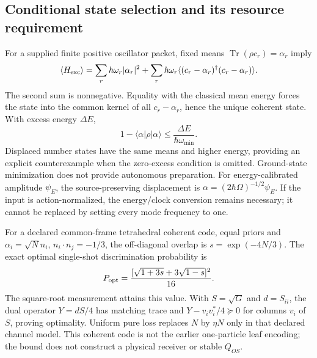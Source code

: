 \documentclass[11pt]{article}
\begin{document}
\subsection{Conditional state selection and its resource requirement}
For a supplied finite positive oscillator packet, fixed means
$\operatorname{Tr}(\rho c_r)=\alpha_r$ imply
\begin{equation}
 \langle H_{\rm exc}\rangle=
 \sum_r\hbar\omega_r|\alpha_r|^2+
 \sum_r\hbar\omega_r
 \langle(c_r-\alpha_r)^\dagger(c_r-\alpha_r)\rangle.
\end{equation}
The second sum is nonnegative. Equality with the classical mean energy
forces the state into the common kernel of all $c_r-\alpha_r$, hence the
unique coherent state. With excess energy $\Delta E$,
\begin{equation}
 1-\langle\alpha|\rho|\alpha\rangle
 \leq \frac{\Delta E}{\hbar\omega_{\min}}.
\end{equation}
Displaced number states have the same means and higher energy, providing
an explicit counterexample when the zero-excess condition is omitted.
Ground-state minimization does not provide autonomous preparation.
For energy-calibrated amplitude $\psi_E$, the source-preserving displacement
is $\alpha=(2\hbar\Omega)^{-1/2}\psi_E$. If the input is action-normalized,
the energy/clock conversion remains necessary; it cannot be replaced by
setting every mode frequency to one.

For a declared common-frame tetrahedral coherent code, equal priors and
$\alpha_i=\sqrt{N}n_i$, $n_i\cdot n_j=-1/3$, the off-diagonal overlap is
$s=\exp(-4N/3)$. The exact optimal single-shot discrimination probability is
\begin{equation}
 P_{\rm opt}=\frac{[\sqrt{1+3s}+3\sqrt{1-s}]^2}{16}.
\end{equation}
The square-root measurement attains this value. With $S=\sqrt{G}$ and
$d=S_{ii}$, the dual operator $Y=dS/4$ has matching trace and
$Y-v_iv_i^*/4\succeq0$ for columns $v_i$ of $S$, proving optimality.
Uniform pure loss replaces $N$ by $\eta N$ only in that declared channel
model. This coherent code is not the earlier one-particle leaf encoding;
the bound does not construct a physical receiver or stable $Q_{OS}$.
\end{document}
